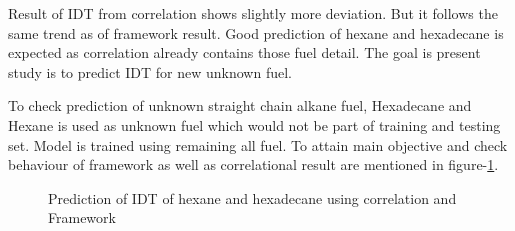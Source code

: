 \documentclass[preprint,12pt]{elsarticle}
\begin{document}
			  		  	  Result of IDT from correlation shows slightly more deviation. But it follows the same trend as of framework result. Good prediction of hexane and hexadecane is expected as correlation already contains those fuel detail. The goal is present  study is to  predict IDT for new unknown fuel.
				  		  	  
				  		  To check prediction of unknown straight chain alkane fuel, Hexadecane and Hexane is used as unknown fuel which would not be part of training and testing set. Model is trained using remaining all fuel. To attain main objective and check behaviour of framework as well as correlational result are mentioned in figure-\ref{fig:unknown}. 
				  		  
				  		  \begin{figure}[H]
				  		  	\centering
				  		  	\hspace{0.5cm}
				  		  	\caption{Prediction of IDT of hexane and hexadecane using correlation and Framework}
				  		  	\label{fig:unknown}
				  		  \end{figure}
				  		  
\end{document}
